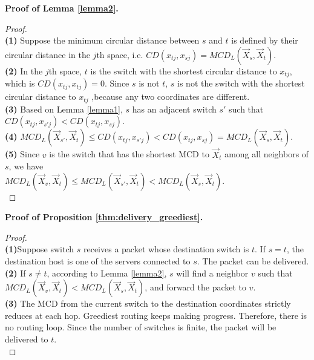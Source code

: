 \documentclass[10pt,conference]{IEEEtran}
\begin{document}
\begin{appendix}
\textbf{Proof of Lemma \ref{lemma2}.}
\begin{proof} \hspace{20 mm}\\
\textbf{(1)} Suppose the minimum circular distance between $s$ and $t$ is defined by their circular distance in the $j$th space, i.e. $CD(x_{tj}, x_{sj})= MCD_L(\vec{X}_s, \vec{X}_{t})$.\\
\textbf{(2)} In  the $j$th space, $t$ is the switch with the shortest circular distance to $x_{tj}$, which is $CD(x_{tj},x_{tj})=0$. Since $s$ is not $t$,  $s$ is not the switch with the shortest circular distance to $x_{tj}$ ,because any two coordinates are different.\\
\textbf{(3)} Based on Lemma \ref{lemma1}, $s$ has an adjacent switch $s'$ such that \\ $CD(x_{tj}, x_{s'j})< CD(x_{tj}, x_{sj})$.\\
\textbf{(4)} $MCD_L(\vec{X}_{s'}, \vec{X}_{t}) \leq CD(x_{tj}, x_{s'j}) < CD(x_{tj}, x_{sj}) =  MCD_L(\vec{X}_s, \vec{X}_{t})$.\\
\textbf{(5)} Since $v$ is the switch that has the shortest MCD to $\vec{X}_{t}$ among all neighbors of $s$, we have \\
$MCD_L(\vec{X}_{v}, \vec{X}_{t}) \leq MCD_L(\vec{X}_{s'}, \vec{X}_{t})< MCD_L(\vec{X}_s, \vec{X}_{t})$.\\
\end{proof}

\textbf{Proof of Proposition \ref{thm:delivery_greediest}.}
\begin{proof} \hspace{20 mm}\\
\textbf{(1)}Suppose switch $s$ receives a packet whose destination switch is $t$. If $s = t$, the destination host is one of the servers connected to $s$. The packet can be delivered. \\
\textbf{(2)} If $s \neq t$, according to Lemma \ref{lemma2}, $s$ will find a neighbor $v$ such that $MCD_L(\vec{X}_v, \vec{X}_{t}) < MCD_L(\vec{X}_s, \vec{X}_{t})$, and forward the packet to $v$. \\
\textbf{(3)} The MCD from the current switch to the destination coordinates strictly reduces at each hop. Greediest routing keeps making progress. Therefore, there is no routing loop. Since the number of switches is finite, the packet will be delivered to $t$.\\
\end{proof}

\iffalse


\end{appendix}
\end{document}
